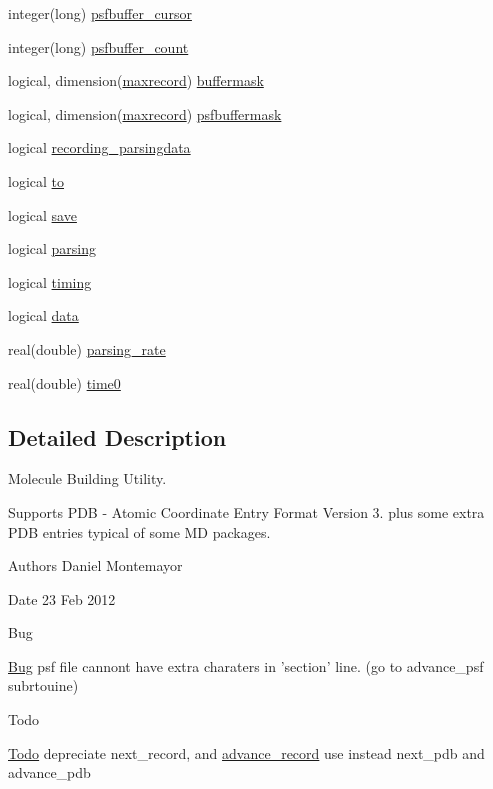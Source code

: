 \begin{DoxyCompactItemize}
\item 
integer(long) \hyperlink{classmolreader_ab080c636a2423beb139bdd65dcd884c3}{psfbuffer\-\_\-cursor}
\item 
integer(long) \hyperlink{classmolreader_af2dddaa7f6249a39287ffcdcbe2ce558}{psfbuffer\-\_\-count}
\item 
logical, dimension(\hyperlink{classmolreader_a7192fdfba4bcb0ee7504a9c6695c7106}{maxrecord}) \hyperlink{classmolreader_a3368bfc7f2d07a7f472a8118220516a9}{buffermask}
\item 
logical, dimension(\hyperlink{classmolreader_a7192fdfba4bcb0ee7504a9c6695c7106}{maxrecord}) \hyperlink{classmolreader_a747bd2c32990916c313506c805317e88}{psfbuffermask}
\item 
logical \hyperlink{classmolreader_a1f82d6f3302ab89b43d1fcbcba5d8fb2}{recording\-\_\-parsingdata}
\item 
logical \hyperlink{classmolreader_aec460f295b88cb8eb8dd58901edce0ba}{to}
\item 
logical \hyperlink{classmolreader_af3ae5caa4d00fa50c74d2f3154e8ea7c}{save}
\item 
logical \hyperlink{classmolreader_a151a8b8c33b86ab86d352aeaaf9ec84b}{parsing}
\item 
logical \hyperlink{classmolreader_a29899cd9778ac12af6bad404c1092518}{timing}
\item 
logical \hyperlink{classmolreader_ad29941441961d6bb225120cc88f93db7}{data}
\item 
real(double) \hyperlink{classmolreader_a5cf7dc5ccdeb068704a693ec6b248796}{parsing\-\_\-rate}
\item 
real(double) \hyperlink{classmolreader_ad5b1ed6898caa1c2161f0cdc6c10fc72}{time0}
\end{DoxyCompactItemize}


\subsection{Detailed Description}
Molecule Building Utility. 

Supports P\-D\-B -\/ Atomic Coordinate Entry Format Version 3. plus some extra P\-D\-B entries typical of some M\-D packages. \begin{DoxyAuthor}{Authors}
Daniel Montemayor 
\end{DoxyAuthor}
\begin{DoxyDate}{Date}
23 Feb 2012 
\end{DoxyDate}
\begin{DoxyRefDesc}{Bug}
\item[\hyperlink{bug__bug000001}{Bug}]psf file cannont have extra charaters in 'section' line. (go to advance\-\_\-psf subrtouine) \end{DoxyRefDesc}
\begin{DoxyRefDesc}{Todo}
\item[\hyperlink{todo__todo000002}{Todo}]depreciate next\-\_\-record, and \hyperlink{interfacemolreader_1_1advance__record}{advance\-\_\-record} use instead next\-\_\-pdb and advance\-\_\-pdb \end{DoxyRefDesc}


